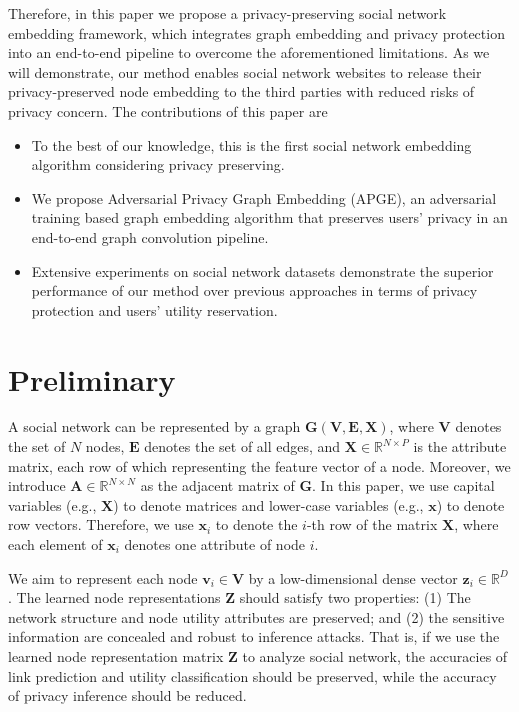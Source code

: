 \documentclass{article}
\begin{document}
Therefore, in this paper we propose a privacy-preserving social network embedding framework, which integrates graph embedding and privacy protection into an end-to-end pipeline to overcome the aforementioned limitations. As we will demonstrate, our method enables social network websites to release their privacy-preserved node embedding to the third parties with reduced risks of privacy concern. The contributions of this paper are
\begin{itemize}
\item To the best of our knowledge, this is the first social network embedding algorithm considering privacy preserving.
\item We propose Adversarial Privacy Graph Embedding (APGE), an adversarial training based graph embedding algorithm that preserves users' privacy in an end-to-end graph convolution pipeline.
\item Extensive experiments on social network datasets demonstrate the superior performance of our method over previous approaches in terms of privacy protection and users' utility reservation.
\end{itemize}


\section{Preliminary}
A social network can be represented by a graph $\mathbf{G}(\mathbf{V},\mathbf{E},\mathbf{X})$, where $\mathbf{V}$ denotes the set of $N$ nodes, $\mathbf{E}$ denotes the set of all edges, and $\mathbf{X} \in \mathbb{R}^{N \times P}$ is the attribute matrix, each row of which representing the feature vector of a node. Moreover, we introduce $\mathbf{A} \in \mathbb{R}^{N \times N}$ as the adjacent  matrix  of $\mathbf{G}$. In this paper, we use capital variables (e.g., $\mathbf{X}$) to denote matrices and lower-case variables (e.g., $\mathbf{x} $) to denote row vectors. Therefore, we use $\mathbf{x}_i$ to denote the $i$-th row of the matrix $\mathbf{X}$, where each element of $\mathbf{x}_i$ denotes one attribute of node $i$.

We aim to represent each node $\mathbf{v}_i \in \mathbf{V}$ by a low-dimensional dense vector $\mathbf{z}_i\in\mathbb{R}^{D}$. The learned node representations $\mathbf{Z}$ should satisfy two properties: (1) The network structure and node utility attributes are preserved; and (2) the sensitive information are concealed and robust to inference attacks. That is, if we use the learned node representation matrix $\mathbf{Z}$ to analyze social network, the accuracies of link prediction and utility classification should be preserved, while the accuracy of privacy inference should be reduced.
\end{document}
